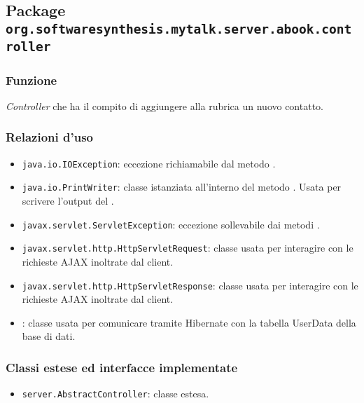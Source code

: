 \subsection{Package \texttt{org.softwaresynthesis.mytalk.server.abook.controller}}\label{sec:call}



\subsubsection*{Funzione}
\textit{Controller} che ha il compito di aggiungere alla rubrica un nuovo contatto.

\subsubsection*{Relazioni d'uso}

\begin{itemize}
	\item \texttt{java.io.IOException}: eccezione richiamabile dal metodo .
	\item \texttt{java.io.PrintWriter}: classe istanziata all'interno del metodo . Usata per scrivere l'output del .
	\item \texttt{javax.servlet.ServletException}: eccezione sollevabile dai metodi .
	\item \texttt{javax.servlet.http.HttpServletRequest}: classe usata per interagire con le richieste AJAX inoltrate dal client.
	\item \texttt{javax.servlet.http.HttpServletResponse}: classe usata per interagire con le richieste AJAX inoltrate dal client.
	\item {}: classe usata per comunicare tramite Hibernate con la tabella UserData della base di dati.
\end{itemize}

\subsubsection*{Classi estese ed interfacce implementate}
\begin{itemize}
	\item \texttt{server.AbstractController}: classe estesa.
\end{itemize}

